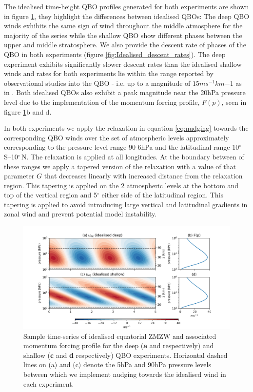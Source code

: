 The idealised time-height QBO profiles generated for both experiments are shown in figure \ref{fig:Idealised_QBO_samples}, they highlight the differences between idealised QBOs: The deep QBO winds exhibits the same sign of wind throughout the middle atmosphere for the majority of the series while the shallow QBO show different phases between the upper and middle stratosphere. We also provide the descent rate of phases of the QBO in both experiments (figure \ref{fig:Idealised_descent_rates}). The deep experiment exhibits significantly slower descent rates than the idealised shallow winds and rates for both experiments lie within the range reported by observational studies into the QBO - i.e. up to a magnitude of $15ms^{-1}km{-1}$ as in \cite{kinnersleyDescent1996}. Both idealised QBOs also exhibit a peak magnitude near the 20hPa pressure level due to the implementation of the momentum forcing profile, $F(p)$, seen in figure \ref{fig:Idealised_QBO_samples}b and d. 

In both experiments we apply the relaxation in equation \ref{eq:nudging} towards the corresponding QBO winds over the set of atmospheric levels approximately corresponding to the pressure level range 90-6hPa and the latitudinal range 10$^{\circ}$\,S--10$^{\circ}$\,N. The relaxation is applied at all longitudes. At the boundary between of these ranges we apply a tapered version of the relaxation with a value of that parameter $G$ that decreases linearly with increased distance from the relaxation region. This tapering is applied on the 2 atmospheric levels at the bottom and top of the vertical region and 5$^\circ$ either side of the latitudinal region. This tapering is applied to avoid introducing large vertical and latitudinal gradients in zonal wind and prevent potential model instability. 

\begin{figure}[h!]
\begin{center}
\noindent\includegraphics[width = \linewidth]{Figures/Figures-deepQBO/Idealised_QBO_features.png}
\caption[Idealised QBO winds used for nudging experiments]{Sample time-series of idealised equatorial ZMZW and associated momentum forcing profile for the deep (\textbf{a} and  respectively) and shallow (\textbf{c} and \textbf{d} respectively) QBO experiments. Horizontal dashed lines on (a) and (c) denote the 5hPa and 90hPa pressure levels between which we implement nudging towards the idealised wind in each experiment.}
\label{fig:Idealised_QBO_samples}
\end{center}
\end{figure}

